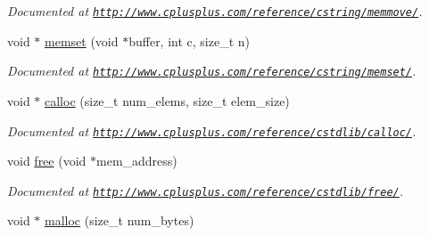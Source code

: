 \begin{DoxyCompactItemize}
\begin{DoxyCompactList}\small\item\em Documented at \href{http://www.cplusplus.com/reference/cstring/memmove/}{\tt http\-://www.\-cplusplus.\-com/reference/cstring/memmove/}. \end{DoxyCompactList}\item 
\hypertarget{group__memory_ga484916591c59d130107eea6380337b69}{void $\ast$ \hyperlink{group__memory_ga484916591c59d130107eea6380337b69}{memset} (void $\ast$buffer, int c, size\-\_\-t n)}\label{group__memory_ga484916591c59d130107eea6380337b69}

\begin{DoxyCompactList}\small\item\em Documented at \href{http://www.cplusplus.com/reference/cstring/memset/}{\tt http\-://www.\-cplusplus.\-com/reference/cstring/memset/}. \end{DoxyCompactList}\item 
\hypertarget{group__memory_gae201ae1031fe85000b4e22abb3a824b2}{void $\ast$ \hyperlink{group__memory_gae201ae1031fe85000b4e22abb3a824b2}{calloc} (size\-\_\-t num\-\_\-elems, size\-\_\-t elem\-\_\-size)}\label{group__memory_gae201ae1031fe85000b4e22abb3a824b2}

\begin{DoxyCompactList}\small\item\em Documented at \href{http://www.cplusplus.com/reference/cstdlib/calloc/}{\tt http\-://www.\-cplusplus.\-com/reference/cstdlib/calloc/}. \end{DoxyCompactList}\item 
\hypertarget{group__memory_ga557a44efb227bec48c165bf5e016b675}{void \hyperlink{group__memory_ga557a44efb227bec48c165bf5e016b675}{free} (void $\ast$mem\-\_\-address)}\label{group__memory_ga557a44efb227bec48c165bf5e016b675}

\begin{DoxyCompactList}\small\item\em Documented at \href{http://www.cplusplus.com/reference/cstdlib/free/}{\tt http\-://www.\-cplusplus.\-com/reference/cstdlib/free/}. \end{DoxyCompactList}\item 
\hypertarget{group__memory_ga5f1a5df9b8c50bd259b8c34c0056e304}{void $\ast$ \hyperlink{group__memory_ga5f1a5df9b8c50bd259b8c34c0056e304}{malloc} (size\-\_\-t num\-\_\-bytes)}\label{group__memory_ga5f1a5df9b8c50bd259b8c34c0056e304}


\end{DoxyCompactItemize}

